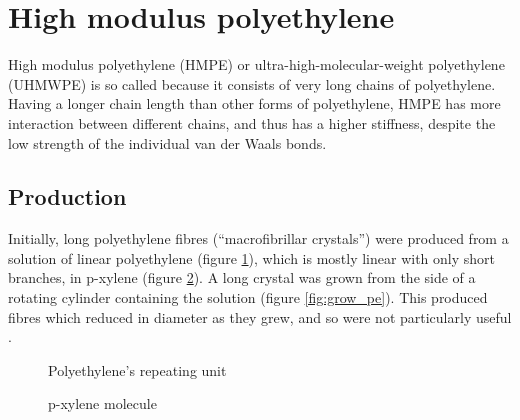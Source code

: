 \section{High modulus polyethylene}
High modulus polyethylene (HMPE) or ultra-high-molecular-weight polyethylene (UHMWPE) is so called because it consists of very long chains of polyethylene. Having a longer chain length than other forms of polyethylene, HMPE has more interaction between different chains, and thus has a higher stiffness, despite the low strength of the individual van der Waals bonds.

\subsection{Production}
Initially, long polyethylene fibres (``macrofibrillar crystals'') were produced from a solution of linear polyethylene (figure \ref{fig:pe}), which is mostly linear with only short branches, in p-xylene (figure \ref{fig:p-xylene}). A long crystal was grown from the side of a rotating cylinder containing the solution (figure \ref{fig:grow_pe}). This produced fibres which reduced in diameter as they grew, and so were not particularly useful .


\begin{figure}
\centering
{}
\caption{Polyethylene's repeating unit}
\label{fig:pe}
\end{figure}

\begin{figure}
\centering
{}
\caption{p-xylene molecule}
\label{fig:p-xylene}
\end{figure}

